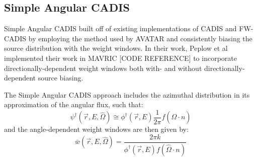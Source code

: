 \subsection{Simple Angular CADIS}

Simple Angular CADIS \cite{peplow_consistent_2012} built off of existing
implementations
of CADIS and FW-CADIS by employing the method used by AVATAR and consistently
biasing the
source distribution with the weight windows. In their work, Peplow et al
implemented their
work in MAVRIC [CODE REFERENCE] to incorporate directionally-dependent weight
windows
both with- and without directionally-dependent source biasing.

The Simple Angular CADIS approach includes the azimuthal distribution in its
approximation
of the angular flux, such that:
\begin{equation}
\psi^{\dagger}(\vec{r}, E, \hat \Omega) \cong \phi^{\dagger}(\vec{r}, E)
\frac{1}{2\pi} f(\hat\Omega \cdot n)
\end{equation}
and the angle-dependent weight windows are then given by:
\begin{equation}
\bar {w} (\vec{r},E,\hat\Omega) = \frac{2 \pi k}{\phi^{\dagger}(\vec{r},E)
                                  f(\hat\Omega \cdot n)}
\end{equation}


